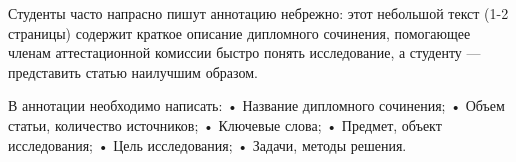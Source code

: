 
Студенты часто напрасно пишут аннотацию небрежно: этот небольшой текст (1-2 страницы) содержит краткое описание дипломного сочинения, помогающее членам аттестационной комиссии быстро понять исследование, а студенту — представить статью наилучшим образом.

В аннотации необходимо написать:
•    Название дипломного сочинения;
•    Объем статьи, количество источников;
•    Ключевые слова;
•    Предмет, объект исследования;
•    Цель исследования;
•    Задачи, методы решения.

\clearpage